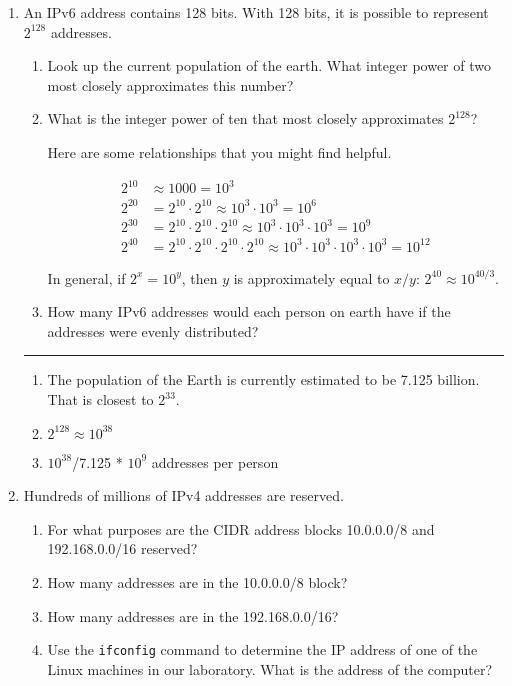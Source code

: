 \documentclass[twoside]{article}
\newenvironment{answer}
  {\vspace*{0.2cm} \rule{12cm}{0.04cm} \vspace*{0.2cm}}
  {\vspace*{0.2cm}}
\begin{document}
\begin{enumerate}
  \item An IPv6 address contains 128 bits. With 128 bits, it
    is possible to represent $2^{128}$ addresses.
  \begin{enumerate}
    \item Look up the current population of the earth. What integer
      power of two most closely approximates this number?
    \item What is the integer power of ten that most closely
      approximates $2^{128}$?

      Here are some relationships that you might find helpful.

      \begin{align*}
        2^{10} & \approx 1000 = 10^3 \\
        2^{20} & = 2^{10} \cdot 2^{10} \approx 10^3 \cdot 10^3 = 10^6 \\
        2^{30} & = 2^{10} \cdot 2^{10} \cdot 2^{10} \approx 10^3 \cdot 10^3 \cdot 10^3 = 10^9 \\
        2^{40} & = 2^{10} \cdot 2^{10} \cdot 2^{10} \cdot 2^{10} \approx
            10^3 \cdot 10^3 \cdot 10^3 \cdot 10^3 = 10^{12}
        \end{align*}

      In general, if $2^x = 10^y$, then $y$ is approximately equal to $x/y$: $2^{40} \approx 10^{40/3}$.
      
    \item How many IPv6 addresses would each person on earth have if the addresses
      were evenly distributed?
    \end{enumerate}

  \begin{answer}

  \begin{enumerate}
    \item The population of the Earth is currently estimated to be 7.125 billion. That is closest to $2^{33}$.
    \item $2^{128} \approx 10^{38}$
    \item $10^{38}$/7.125 * $10^{9}$ addresses per person
    \end{enumerate}

    \end{answer}

  \item Hundreds of millions of IPv4 addresses are reserved.
  \begin{enumerate}
    \item For what purposes are the CIDR address blocks 10.0.0.0/8 and 192.168.0.0/16 reserved?
    \item How many addresses are in the 10.0.0.0/8 block?
    \item How many addresses are in the 192.168.0.0/16?
    \item Use the \verb+ifconfig+ command to determine the IP address of
      one of the Linux machines in our laboratory. What is the address of the computer?
    \end{enumerate}


\end{enumerate}
\end{document}
